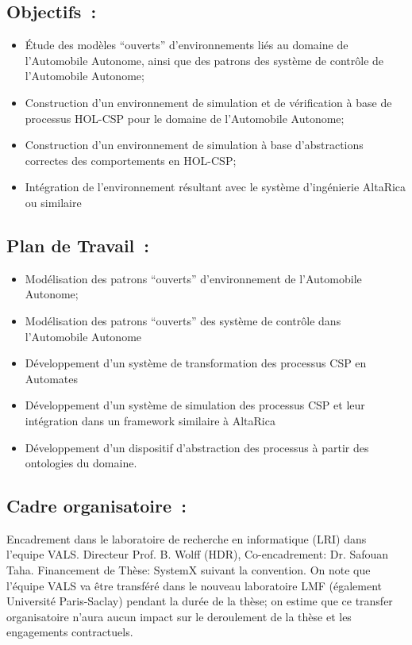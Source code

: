 \documentclass[a4paper,10pt]{article}
\begin{document}
\subsection*{Objectifs~:}
\begin{itemize}
\item Étude des modèles ``ouverts''  d'environnements
         liés au domaine de l'Automobile Autonome, ainsi que des patrons
         des système de contrôle de l'Automobile Autonome;
\item Construction d'un environnement de simulation et de vérification à base de
         processus HOL-CSP pour le domaine  de l'Automobile Autonome;
\item Construction d'un environnement de simulation à base d'abstractions correctes 
      des comportements en HOL-CSP;
\item Intégration de l'environnement résultant avec le système d'ingénierie 
      AltaRica ou similaire
\end{itemize}

\subsection*{Plan de Travail~:}
\begin{itemize}
\item Modélisation des patrons ``ouverts''  d'environnement de l'Automobile Autonome;
\item Modélisation des patrons ``ouverts'' des système de contrôle dans l'Automobile Autonome
\item Développement d'un système de transformation des processus CSP en Automates
\item Développement d'un système de simulation des processus CSP et leur intégration dans un framework similaire à AltaRica
\item Développement d'un dispositif d'abstraction des processus à partir des ontologies du domaine.
\end{itemize}

\subsection*{Cadre organisatoire~:}
Encadrement dans le laboratoire de recherche en informatique (LRI) dans l'equipe VALS.
Directeur Prof. B. Wolff (HDR), Co-encadrement: Dr. Safouan Taha.
Financement de Thèse: SystemX suivant la convention. On note que l'équipe VALS va 
être transféré dans le nouveau laboratoire LMF (également Université Paris-Saclay) 
pendant la durée de la thèse;  on estime que ce transfer organisatoire n'aura aucun 
impact sur le deroulement de la thèse et les engagements contractuels.



\end{document}
